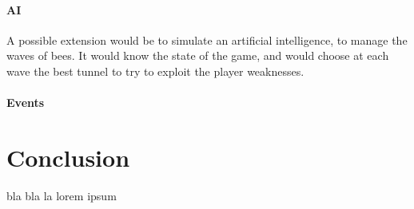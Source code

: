 \documentclass[a4paper]{article}
\begin{document}
\paragraph{AI} A possible extension would be to simulate an artificial intelligence, to manage the waves of bees. It would know the state of the game, and would choose at each wave the best tunnel to try to exploit the player weaknesses.

\paragraph{Events}


\section*{Conclusion}
bla bla la lorem ipsum
\end{document}
